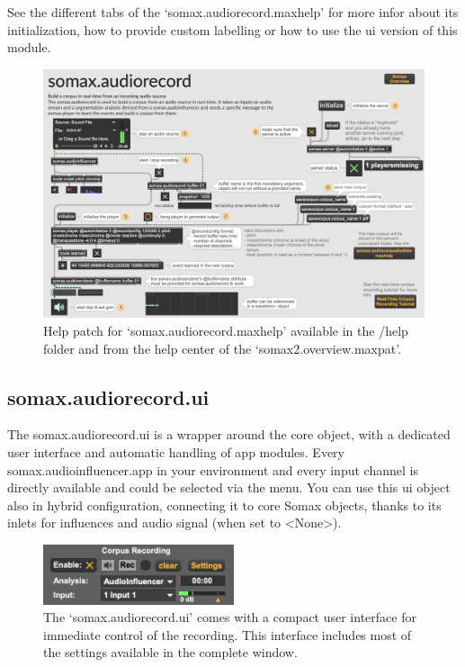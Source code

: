 See the different tabs of the `somax.audiorecord.maxhelp' for more infor about its initialization, how to provide custom labelling or how to use the ui version of this module.

\begin{figure}[H]
    \centering        
 	\includegraphics[width=1\textwidth, keepaspectratio]{somax2-6-user-guide/img/audiorecord_help.png}
    \caption{Help patch for `somax.audiorecord.maxhelp' available in the /help folder and from the help center of the `somax2.overview.maxpat'.}
    \label{fig:audiorecord_help}
\end{figure}



\subsection{somax.audiorecord.ui}

The somax.audiorecord.ui is a wrapper around the core object, with a dedicated user interface and automatic handling of app modules. Every somax.audioinfluencer.app in your environment and every input channel is directly available and could be selected via the menu. You can use this ui object also in hybrid configuration, connecting it to core Somax objects, thanks to its inlets for influences and audio signal (when set to <None>).

\begin{figure}[H]
    \centering        
 	\includegraphics[width=0.5\textwidth]{somax2-6-user-guide/img/audiorecord_compact.png}
    \caption{The `somax.audiorecord.ui' comes with a compact user interface for immediate control of the recording. This interface includes most of the settings available in the complete window.}
    \label{fig:audiorecord_ui}
\end{figure}

